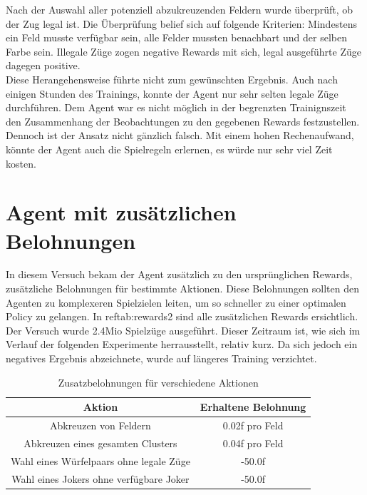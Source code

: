 Nach der Auswahl aller potenziell abzukreuzenden Feldern wurde überprüft, ob der Zug legal ist. Die Überprüfung belief sich auf folgende Kriterien: Mindestens ein Feld musste verfügbar sein, alle Felder mussten benachbart und der selben Farbe sein. Illegale Züge zogen negative Rewards mit sich, legal ausgeführte Züge dagegen positive. \\
Diese Herangehensweise führte nicht zum gewünschten Ergebnis. Auch nach einigen Stunden des Trainings, konnte der Agent nur sehr selten legale Züge durchführen. Dem Agent war es nicht möglich in der begrenzten Trainignszeit den Zusammenhang der Beobachtungen zu den gegebenen Rewards festzustellen.
Dennoch ist der Ansatz nicht gänzlich falsch. Mit einem hohen Rechenaufwand, könnte der Agent auch die Spielregeln erlernen, es würde nur sehr viel Zeit kosten. 




\newpage
\section{Agent mit zusätzlichen Belohnungen}
In diesem Versuch bekam der Agent zusätzlich zu den ursprünglichen Rewards, zusätzliche Belohnungen für bestimmte Aktionen. Diese Belohnungen sollten den Agenten zu komplexeren Spielzielen leiten, um so schneller zu einer optimalen Policy zu gelangen.
In ref{tab:rewards2} sind alle zusätzlichen Rewards ersichtlich. Der Versuch wurde 2.4Mio Spielzüge ausgeführt. Dieser Zeitraum ist, wie sich im Verlauf der folgenden Experimente herrausstellt, relativ kurz. Da sich jedoch ein negatives Ergebnis abzeichnete, wurde auf längeres Training verzichtet.  

\begin{table}[!htbp]
    \centering
    \begin{tabular}{|c|c|}
    \hline
    \textbf{Aktion} & \textbf{Erhaltene Belohnung} \\
    \hline
    Abkreuzen von Feldern & 0.02f pro Feld \\
    \hline
    Abkreuzen eines gesamten Clusters & 0.04f pro Feld \\
    \hline
    Wahl eines Würfelpaars ohne legale Züge & -50.0f \\
    \hline
    Wahl eines Jokers ohne verfügbare Joker & -50.0f \\
    \hline
    \end{tabular}
    \caption{Zusatzbelohnungen für verschiedene Aktionen}
    \label{tab:rewards2}
\end{table}



